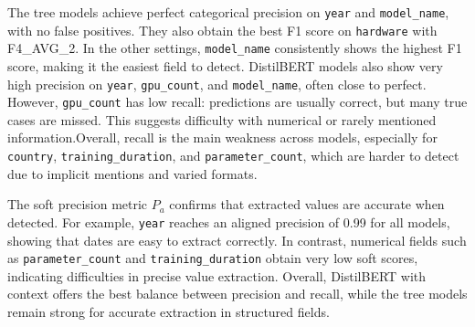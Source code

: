 \documentclass{article}
\theoremstyle{plain}
\theoremstyle{definition}
\theoremstyle{remark}
\begin{document}
\begin{table}[H]
\centering
{}
\caption{Soft metrics of DistilBERT with context on GreenMIR.}
\end{table}

The tree models achieve perfect categorical precision on \texttt{year} and \texttt{model\_name}, with no false positives. They also obtain the best F1 score on \texttt{hardware} with F4\_AVG\_2. In the other settings, \texttt{model\_name} consistently shows the highest F1 score, making it the easiest field to detect. DistilBERT models also show very high precision on \texttt{year}, \texttt{gpu\_count}, and \texttt{model\_name}, often close to perfect. However, \texttt{gpu\_count} has low recall: predictions are usually correct, but many true cases are missed. This suggests difficulty with numerical or rarely mentioned information.Overall, recall is the main weakness across models, especially for \texttt{country}, \texttt{training\_duration}, and \texttt{parameter\_count}, which are harder to detect due to implicit mentions and varied formats.

The soft precision metric $P_a$ confirms that extracted values are accurate when detected. For example, \texttt{year} reaches an aligned precision of 0.99 for all models, showing that dates are easy to extract correctly. In contrast, numerical fields such as \texttt{parameter\_count} and \texttt{training\_duration} obtain very low soft scores, indicating difficulties in precise value extraction.
Overall, DistilBERT with context offers the best balance between precision and recall, while the tree models remain strong for accurate extraction in structured fields.
\end{document}
